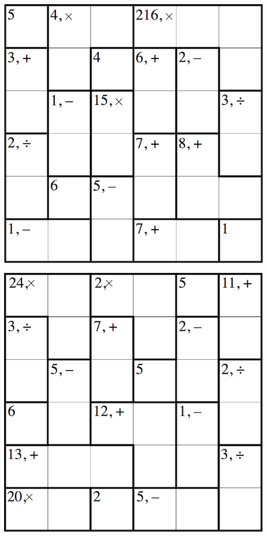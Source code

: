 
\includegraphics[scale=1]{Gambar/Lampiran/6x6_5.png}

\includegraphics[scale=1]{Gambar/Lampiran/6x6_6.png}
